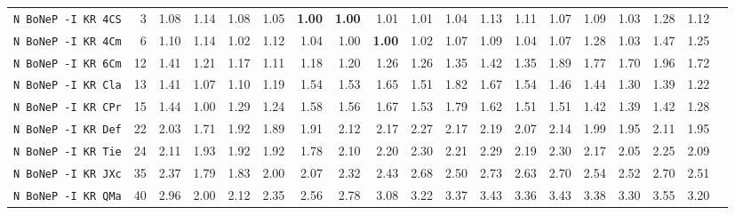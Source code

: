 \begin{tabular}{l | r @{~~} r | r@{~~}r@{~~}r@{~~}r@{~~}r@{~~}r@{~~}r@{~~}r@{~~}r@{~~}r@{~~}r@{~~}r@{~~}r@{~~}r@{~~}r@{~~}r|}
\verb+N BoNeP -I KR 4CS+ & 3 & 1.08 & 1.14&1.08&1.05&\textbf{1.00}&\textbf{1.00}&1.01&1.01&1.04&1.13&1.11&1.07&1.09&1.03&1.28&1.12\\
\verb+N BoNeP -I KR 4Cm+ & 6 & 1.10 & 1.14&1.02&1.12&1.04&1.00&\textbf{1.00}&1.02&1.07&1.09&1.04&1.07&1.28&1.03&1.47&1.25\\
\verb+N BoNeP -I KR 6Cm+ & 12 & 1.41 & 1.21&1.17&1.11&1.18&1.20&1.26&1.26&1.35&1.42&1.35&1.89&1.77&1.70&1.96&1.72\\
\verb+N BoNeP -I KR Cla+ & 13 & 1.41 & 1.07&1.10&1.19&1.54&1.53&1.65&1.51&1.82&1.67&1.54&1.46&1.44&1.30&1.39&1.22\\
\verb+N BoNeP -I KR CPr+ & 15 & 1.44 & 1.00&1.29&1.24&1.58&1.56&1.67&1.53&1.79&1.62&1.51&1.51&1.42&1.39&1.42&1.28\\
\verb+N BoNeP -I KR Def+ & 22 & 2.03 & 1.71&1.92&1.89&1.91&2.12&2.17&2.27&2.17&2.19&2.07&2.14&1.99&1.95&2.11&1.95\\
\verb+N BoNeP -I KR Tie+ & 24 & 2.11 & 1.93&1.92&1.92&1.78&2.10&2.20&2.30&2.21&2.29&2.19&2.30&2.17&2.05&2.25&2.09\\
\verb+N BoNeP -I KR JXc+ & 35 & 2.37 & 1.79&1.83&2.00&2.07&2.32&2.43&2.68&2.50&2.73&2.63&2.70&2.54&2.52&2.70&2.51\\
\verb+N BoNeP -I KR QMa+ & 40 & 2.96 & 2.00&2.12&2.35&2.56&2.78&3.08&3.22&3.37&3.43&3.36&3.43&3.38&3.30&3.55&3.20\\
\end{tabular}
